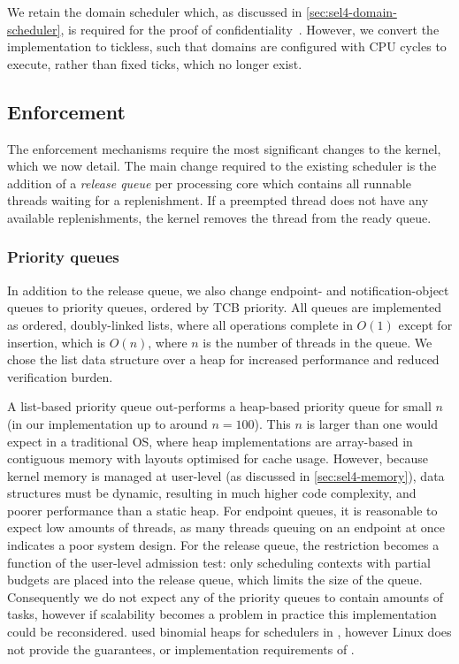 We retain the domain scheduler which, as discussed in \cref{sec:sel4-domain-scheduler}, is required
for the proof of confidentiality~\citep{Murray_MBGBSLGK_13}. However, we convert the 
implementation to tickless, such that domains are
configured with CPU cycles to execute, rather than fixed ticks, which no longer exist.

\subsection{Enforcement}

The enforcement mechanisms require the most significant changes to the kernel, which we now detail.
The main change required to the existing scheduler is the addition of a \emph{release queue} per
processing core which contains all runnable threads waiting for a replenishment. If a
preempted thread does not have any available replenishments, the kernel removes the thread from the
ready queue.

\subsubsection{Priority queues}

In addition to the release queue, we also change endpoint- and notification-object queues
to priority queues, ordered by \gls{TCB} priority. All queues are implemented as ordered, doubly-linked
lists, where all operations complete in $O(1)$ except for insertion, which is $O(n)$, where $n$ 
is the number of threads in the queue. 
We chose the list data structure over a heap for increased performance and reduced verification
burden.

A list-based priority queue out-performs a heap-based priority queue for small $n$ (in our
implementation up to around $n = 100$).  This $n$ is larger than one would expect in a traditional
\gls{OS}, where heap implementations are array-based in contiguous memory with layouts optimised for
cache usage.  However, because \selfour kernel memory is
managed at user-level (as discussed in \cref{sec:sel4-memory}), data structures must be dynamic, 
resulting in much higher code complexity, and poorer performance than a static heap. 
For endpoint queues, it is reasonable to expect low amounts of threads, as many threads queuing on
an endpoint at once indicates a poor system design. For the release queue, the restriction
becomes a function of the user-level admission test: only scheduling contexts with 
partial budgets are placed into the release queue, which limits the size of the queue.
Consequently we do not expect any of the priority queues to contain amounts of tasks,
however if scalability becomes a problem in
practice this implementation could be reconsidered. \citet{Brandenburg:phd} used
binomial heaps for schedulers in \litmus, however Linux does not provide the guarantees, or
implementation requirements of \selfour.

